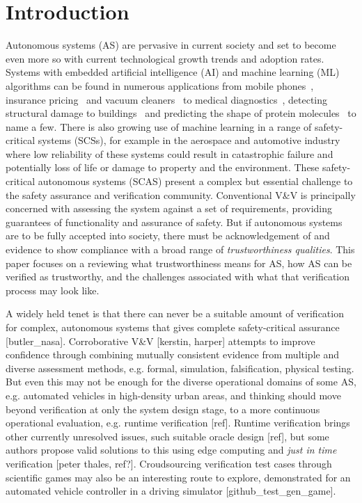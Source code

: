 \section{Introduction}
Autonomous systems (AS) are pervasive in current society and set to become even more so with current technological growth trends and adoption rates. Systems with embedded artificial intelligence (AI) and machine learning (ML) algorithms can be found in numerous applications from mobile phones~\cite{medium_ai_phones}, insurance pricing~\cite{kuo2020towards} and vacuum cleaners~\cite{tf_vacuum} to medical diagnostics~\cite{kononenko2001machine}, detecting structural damage to buildings~\cite{avci2021review} and predicting the shape of protein molecules~\cite{alpha_fold} to name a few. 
%
There is also growing use of machine learning in a range of safety-critical systems (SCSs), for example in the aerospace and automotive industry where low reliability of these systems could result in catastrophic failure and potentially loss of life or damage to property and the environment. These safety-critical autonomous systems (SCAS) present a complex but essential challenge to the safety assurance and verification community. 
%
Conventional V\&V is principally concerned with assessing the system against a set of requirements, providing guarantees of functionality and assurance of safety. But if autonomous systems are to be fully accepted into society, there must be acknowledgement of and evidence to show compliance with a broad range of \emph{trustworthiness qualities}. 
%
This paper focuses on a reviewing what trustworthiness means for AS, how AS can be verified as trustworthy, and the challenges associated with what that verification process may look like. 

A widely held tenet is that there can never be a suitable amount of verification for complex, autonomous systems that gives complete safety-critical assurance [butler_nasa]. Corroborative V\&V [kerstin, harper] attempts to improve confidence through combining mutually consistent evidence from multiple and diverse assessment methods, e.g. formal, simulation, falsification, physical testing. 
%
But even this may not be enough for the diverse operational domains of some AS, e.g. automated vehicles in high-density urban areas, and thinking should move beyond verification at only the system design stage, to a more continuous operational evaluation, e.g. runtime verification [ref]. Runtime verification brings other currently unresolved issues, such suitable oracle design [ref], but some authors propose valid solutions to this using edge computing and \emph{just in time} verification [peter thales, ref?]. 
%
Croudsourcing verification test cases through scientific games may also be an interesting route to explore, demonstrated for an automated vehicle controller in a driving simulator [github_test_gen_game]. 


